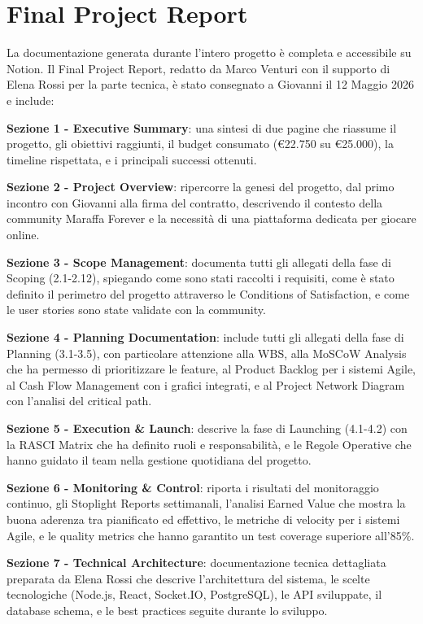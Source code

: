 \section{Final Project Report}

La documentazione generata durante l'intero progetto è completa e accessibile su Notion. Il Final Project Report, redatto da Marco Venturi con il supporto di Elena Rossi per la parte tecnica, è stato consegnato a Giovanni il 12 Maggio 2026 e include:

\textbf{Sezione 1 - Executive Summary}: una sintesi di due pagine che riassume il progetto, gli obiettivi raggiunti, il budget consumato (€22.750 su €25.000), la timeline rispettata, e i principali successi ottenuti.

\textbf{Sezione 2 - Project Overview}: ripercorre la genesi del progetto, dal primo incontro con Giovanni alla firma del contratto, descrivendo il contesto della community Maraffa Forever e la necessità di una piattaforma dedicata per giocare online.

\textbf{Sezione 3 - Scope Management}: documenta tutti gli allegati della fase di Scoping (2.1-2.12), spiegando come sono stati raccolti i requisiti, come è stato definito il perimetro del progetto attraverso le Conditions of Satisfaction, e come le user stories sono state validate con la community.

\textbf{Sezione 4 - Planning Documentation}: include tutti gli allegati della fase di Planning (3.1-3.5), con particolare attenzione alla WBS, alla MoSCoW Analysis che ha permesso di prioritizzare le feature, al Product Backlog per i sistemi Agile, al Cash Flow Management con i grafici integrati, e al Project Network Diagram con l'analisi del critical path.

\textbf{Sezione 5 - Execution \& Launch}: descrive la fase di Launching (4.1-4.2) con la RASCI Matrix che ha definito ruoli e responsabilità, e le Regole Operative che hanno guidato il team nella gestione quotidiana del progetto.

\textbf{Sezione 6 - Monitoring \& Control}: riporta i risultati del monitoraggio continuo, gli Stoplight Reports settimanali, l'analisi Earned Value che mostra la buona aderenza tra pianificato ed effettivo, le metriche di velocity per i sistemi Agile, e le quality metrics che hanno garantito un test coverage superiore all'85\%.

\textbf{Sezione 7 - Technical Architecture}: documentazione tecnica dettagliata preparata da Elena Rossi che descrive l'architettura del sistema, le scelte tecnologiche (Node.js, React, Socket.IO, PostgreSQL), le API sviluppate, il database schema, e le best practices seguite durante lo sviluppo.

